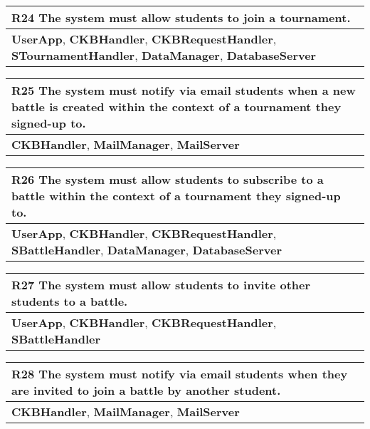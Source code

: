 \begin{table}[H]
    \begin{tabularx}{\textwidth}{X}
        \toprule
        \textbf{R24} The system must allow students to join a tournament. \\ \midrule
        \textbf{UserApp}, \textbf{CKBHandler}, \textbf{CKBRequestHandler}, \textbf{STournamentHandler}, \textbf{DataManager}, \textbf{DatabaseServer} \\
        \end{tabularx}
\end{table}

\begin{table}[H]
    \begin{tabularx}{\textwidth}{X}
        \toprule
        \textbf{R25} The system must notify via email students when a new battle is created within the context of a tournament they signed-up to. \\ \midrule
        \textbf{CKBHandler}, \textbf{MailManager}, \textbf{MailServer} \\    \end{tabularx}
\end{table}

\begin{table}[H]
    \begin{tabularx}{\textwidth}{X}
        \toprule
        \textbf{R26} The system must allow students to subscribe to a battle within the context of a tournament they signed-up to. \\ \midrule
        \textbf{UserApp}, \textbf{CKBHandler}, \textbf{CKBRequestHandler}, \textbf{SBattleHandler}, \textbf{DataManager}, \textbf{DatabaseServer}                    \\
    \end{tabularx}
\end{table}

\begin{table}[H]
    \begin{tabularx}{\textwidth}{X}
        \toprule
        \textbf{R27} The system must allow students to invite other students to a battle. \\ \midrule
        \textbf{UserApp}, \textbf{CKBHandler}, \textbf{CKBRequestHandler}, \textbf{SBattleHandler}                     \\
    \end{tabularx}
\end{table}

\begin{table}[H]
    \begin{tabularx}{\textwidth}{X}
        \toprule
        \textbf{R28} The system must notify via email students when they are invited to join a battle by another student. \\ \midrule
        \textbf{CKBHandler}, \textbf{MailManager}, \textbf{MailServer} \\    
    \end{tabularx}
\end{table}

